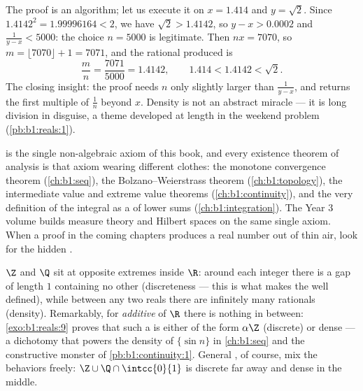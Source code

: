 \begin{example}\label{ex:b1:reals:densityrun}
The proof is an algorithm; let us execute it on $x = 1.414$ and
$y = \sqrt 2$. Since $1.4142^2 = 1.99996164 < 2$, we have $\sqrt 2
> 1.4142$, so $y - x > 0.0002$ and $\frac{1}{y - x} < 5000$: the
choice $n = 5000$ is legitimate. Then $nx = 7070$, so $m = \lfloor
7070 \rfloor + 1 = 7071$, and the rational produced is
\[
\frac{m}{n} = \frac{7071}{5000} = 1.4142,
\qquad
1.414 < 1.4142 < \sqrt 2 .
\]
The closing insight: the proof needs $n$ only slightly larger than
$\frac{1}{y-x}$, and returns the first multiple of $\frac 1n$
beyond $x$. Density is not an abstract miracle --- it is long
division in disguise, a theme developed at length in the weekend
problem (\cref{pb:b1:reals:1}).
\end{example}

\begin{remark}
 is the single non-algebraic axiom of this
book, and every existence theorem of analysis is that axiom
wearing different clothes: the monotone convergence theorem
(\cref{ch:b1:seq}), the Bolzano--Weierstrass theorem
(\cref{ch:b1:topology}), the intermediate value and extreme value
theorems (\cref{ch:b1:continuity}), and the very definition of the
integral as a  of lower sums (\cref{ch:b1:integration}).
The Year 3 volume builds measure theory and Hilbert spaces on the
same single axiom. When a proof in the coming chapters produces a
real number out of thin air, look for the hidden .
\end{remark}

\begin{remark}
$\Z$ and $\Q$ sit at opposite extremes inside $\R$: around each
integer there is a gap of length $1$ containing no other
(discreteness --- this is what makes the  well defined),
while between any two reals there are infinitely many rationals
(density). Remarkably, for \emph{additive } of $\R$
there is nothing in between: \cref{exo:b1:reals:9} proves that
such a  is either of the form $\alpha\Z$ (discrete) or
dense --- a dichotomy that powers the density of $\{\sin n\}$ in
\cref{ch:b1:seq} and the constructive monster of
\cref{pb:b1:continuity:1}. General , of course, mix the
behaviors freely: $\Z \cup \Q\cap\intcc{0}{1}$ is discrete far
away and dense in the middle.
\end{remark}

